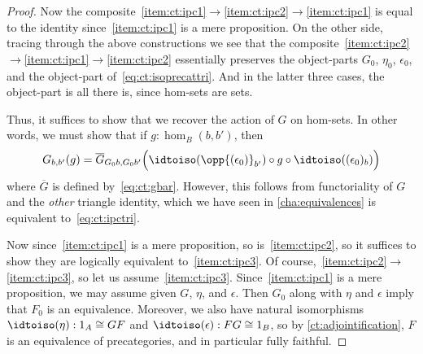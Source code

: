 \begin{proof}
  Now the composite~\ref{item:ct:ipc1}$\to$\ref{item:ct:ipc2}$\to$\ref{item:ct:ipc1} is equal to the identity since~\ref{item:ct:ipc1} is a mere proposition.
  On the other side, tracing through the above constructions we see that the composite~\ref{item:ct:ipc2}$\to$\ref{item:ct:ipc1}$\to$\ref{item:ct:ipc2} essentially preserves the object-parts $G_0$, $\eta_0$, $\epsilon_0$, and the object-part of~\eqref{eq:ct:isoprecattri}.
  And in the latter three cases, the object-part is all there is, since hom-sets are sets.

  Thus, it suffices to show that we recover the action of $G$ on hom-sets.
  In other words, we must show that if $g:\hom_B(b,b')$, then
  \[ G_{b,b'}(g) =
  \overline{G}_{G_0b,G_0b'}\Big(\idtoiso(\opp{(\epsilon_0)}_{b'}) \circ g \circ \idtoiso((\epsilon_0)_b)\Big)
  \]
  where $\overline{G}$ is defined by~\eqref{eq:ct:gbar}.
  However, this follows from functoriality of $G$ and the \emph{other} triangle identity, which we have seen in \cref{cha:equivalences} is equivalent to~\eqref{eq:ct:ipctri}.

  Now since~\ref{item:ct:ipc1} is a mere proposition, so is~\ref{item:ct:ipc2}, so it suffices to show they are logically equivalent to~\ref{item:ct:ipc3}.
  Of course,~\ref{item:ct:ipc2}$\to$\ref{item:ct:ipc3}, so let us assume~\ref{item:ct:ipc3}.
  Since~\ref{item:ct:ipc1} is a mere proposition, we may assume given $G$, $\eta$, and $\epsilon$.
  Then $G_0$ along with $\eta$ and $\epsilon$ imply that $F_0$ is an equivalence.
  Moreover, we also have natural isomorphisms $\idtoiso(\eta):1_A\cong GF$ and $\idtoiso(\epsilon):FG\cong 1_B$, so by \cref{ct:adjointification}, $F$ is an equivalence of precategories, and in particular fully faithful.
\end{proof}
